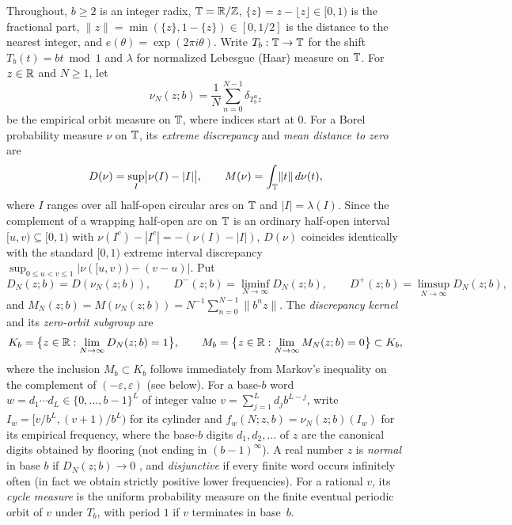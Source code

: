\documentclass[11pt]{article}
\newcommand{\dist}[1]{\lVert #1\rVert}
\newcommand{\fr}[1]{\{#1\}}
\begin{document}
Throughout, $b\ge2$ is an integer radix, $\mathbb T=\mathbb R/\mathbb Z$, $\fr{z}=z-\lfloor z\rfloor\in[0,1)$ is the fractional part, $\dist{z}=\min(\fr{z},1-\fr{z})\in[0,1/2]$ is the distance to the nearest integer, and $e(\theta)=\exp(2\pi i\theta)$. Write $T_b:\mathbb T\to\mathbb T$ for the shift $T_b(t)=bt\bmod1$ and $\lambda$ for normalized Lebesgue (Haar) measure on $\mathbb T$. For $z\in\mathbb R$ and $N\ge1$, let
\[
\nu_N(z;b)=\frac1N\sum_{n=0}^{N-1}\delta_{T_b^n z}
\]
be the empirical orbit measure on $\mathbb T$, where indices start at $0$. For a Borel probability measure $\nu$ on $\mathbb T$, its \emph{extreme discrepancy} and \emph{mean distance to zero} are
\[
D(\nu)=\sup_{I}\bigl|\nu(I)-|I|\bigr|,\qquad M(\nu)=\int_{\T}\dist{t}\,d\nu(t),
\]
where $I$ ranges over all half-open circular arcs on $\mathbb T$ and $|I|=\lambda(I)$. Since the complement of a wrapping half-open arc on $\mathbb T$ is an ordinary half-open interval $[u,v)\subseteq[0,1)$ with $\nu(I^c)-|I^c|=-(\nu(I)-|I|)$, $D(\nu)$ coincides identically with the standard $[0,1)$ extreme interval discrepancy $\sup_{0\le u<v\le1}|\nu([u,v))-(v-u)|$. Put
\[
D_N(z;b)=D(\nu_N(z;b)),\qquad D^-(z;b)=\liminf_{N\to\infty}D_N(z;b),\qquad D^+(z;b)=\limsup_{N\to\infty}D_N(z;b),
\]
and $M_N(z;b)=M(\nu_N(z;b))=N^{-1}\sum_{n=0}^{N-1}\dist{b^nz}$. The \emph{discrepancy kernel} and its \emph{zero-orbit subgroup} are
\[
K_b=\bigl\{z\in\mathbb R:\lim_{N\to\infty}D_N(z;b)=1\bigr\},\qquad
M_b=\bigl\{z\in\mathbb R:\lim_{N\to\infty}M_N(z;b)=0\bigr\}\subset K_b,
\]
where the inclusion $M_b\subset K_b$ follows immediately from Markov's inequality on the complement of $(-\varepsilon,\varepsilon)$ (see  below). For a base-$b$ word $w=d_1\cdots d_L\in\{0,\dots,b-1\}^L$ of integer value $v=\sum_{j=1}^L d_jb^{L-j}$, write $I_w=[v/b^L,(v+1)/b^L)$ for its cylinder and $f_w(N;z,b)=\nu_N(z;b)(I_w)$ for its empirical frequency, where the base-$b$ digits $d_1,d_2,\dots$ of $z$ are the canonical digits obtained by flooring (not ending in $(b-1)^\infty$). A real number $z$ is \emph{normal} in base $b$ if $D_N(z;b)\to0$ \cite[Chapter~1]{KN}, and \emph{disjunctive} if every finite word occurs infinitely often (in fact we obtain strictly positive lower frequencies). For a rational $v$, its \emph{cycle measure} is the uniform probability measure on the finite eventual periodic orbit of $v$ under $T_b$, with period $1$ if $v$ terminates in base~$b$.
\end{document}

